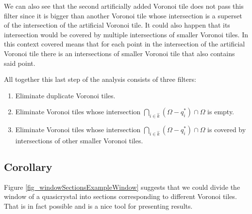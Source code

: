 \documentclass[text.tex]{subfiles}
\begin{document}
We can also see that the second artificially added Voronoi tile does not pass this filter since it is bigger than another Voronoi tile whose intersection is a superset of the intersection of the artificial Voronoi tile. It could also happen that its intersection would be covered by multiple intersections of smaller Voronoi tiles. In this context covered means that for each point in the intersection of the artificial Voronoi tile there is an intersections of smaller Voronoi tile that also contains said point. 

All together this last step of the analysis consists of three filters: 
\begin{enumerate}
\item Eliminate duplicate Voronoi tiles. 
\item Eliminate Voronoi tiles whose intersection $\bigcap\limits_{i\in\hat{k}}(\Omega-q_i^\ast)\cap\Omega$ is empty. 
\item Eliminate Voronoi tiles whose intersection $\bigcap\limits_{i\in\hat{k}}(\Omega-q_i^\ast)\cap\Omega$ is covered by intersections of other smaller Voronoi tiles. 
\end{enumerate}

\subsection*{Corollary}
Figure \ref{fig_windowSectionsExampleWindow} suggests that we could divide the window of a quasicrystal into sections corresponding to different Voronoi tiles. That is in fact possible and is a nice tool for presenting results. 
\end{document}
